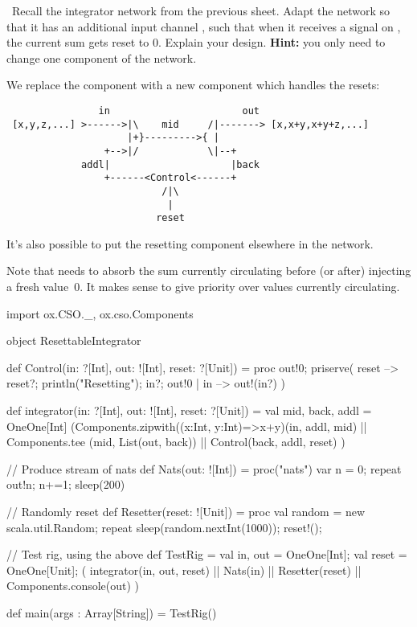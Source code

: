 \begin{nontutequestion}
\Programming\
Recall the integrator network from the previous sheet.  Adapt the network so
that it has an additional input channel 
, such that when it receives a signal on
, the current sum gets reset to 0.  Explain your design.  {\bf
  Hint:} you only need to change one component of the network.
\end{nontutequestion}


\begin{nontuteanswer}
\Small
We replace the  component with a new component
 which handles the resets:
%
\begin{verbatim}
                in                       out
 [x,y,z,...] >------>|\    mid     /|-------> [x,x+y,x+y+z,...]
                     |+}--------->{ |
                 +-->|/            \|--+
             addl|                     |back
                 +------<Control<------+
                           /|\
                            |
                          reset
\end{verbatim}
%
It's also possible to put the resetting component elsewhere in the network.

Note that \SCALA{Control} needs to absorb the sum currently circulating before
(or after) injecting a fresh value~$0$.  It makes sense to give 
priority over values currently circulating.
%
\begin{scala}
import ox.CSO._, ox.cso.Components

object ResettableIntegrator{

  def Control(in: ?[Int], out: ![Int], reset: ?[Unit]) 
  = proc{
    out!0;
    priserve(
      reset --> { 
        reset?; println("Resetting"); in?; out!0 
      }
      | in --> { out!(in?) }
    )
  }  

  def integrator(in: ?[Int], out: ![Int], reset: ?[Unit])
  = {
    val mid, back, addl = OneOne[Int]
    (Components.zipwith((x:Int, y:Int)=>x+y)(in, addl, mid)
    || Components.tee (mid, List(out, back))
    || Control(back, addl, reset)
    )
  }

  // Produce stream of nats
  def Nats(out: ![Int]) = proc("nats"){
    var n = 0;
    repeat{ out!n; n+=1; sleep(200) }
  }

  // Randomly reset
  def Resetter(reset: ![Unit]) = proc{
    val random = new scala.util.Random;
    repeat{ sleep(random.nextInt(1000)); reset!(); }
  }  

  // Test rig, using the above
  def TestRig = {
    val in, out = OneOne[Int]; val reset = OneOne[Unit];
    ( integrator(in, out, reset) || 
     Nats(in) || Resetter(reset) || 
     Components.console(out) )
  }

  def main(args : Array[String]) = TestRig()
}
\end{scala}

\end{nontuteanswer}
